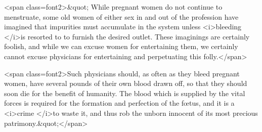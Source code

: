 <span class=font2>&quot; While pregnant women do not continue to menstruate, some old
women of either sex in and out of the profession have imagined that
impurities must accumulate in the system unless <i>bleeding </i>is resorted to
to furnish the desired outlet. These imaginings are certainly foolish,
and while we can excuse women for entertaining them, we certainly
cannot excuse physicians for entertaining and perpetuating this folly.</span>

<span class=font2>Such physicians should, as often as they bleed pregnant women,
have several pounds of their own blood drawn off, so that they should
soon die for the benefit of humanity. The blood which is supplied by
the vital forces is required for the formation and perfection of the fœtus,
and it is a <i>crime </i>to waste it, and thus rob the unborn innocent of its
most precious patrimony.&quot;</span>\endinput
